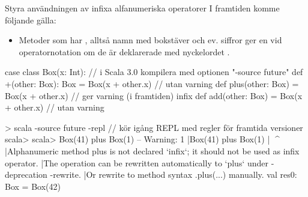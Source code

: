 \begin{Slide}{Styra användningen av infixa alfanumeriska operatorer}
I framtiden komme följande gälla:
\begin{itemize}
\item Metoder som har , alltså namn med bokstäver och ev. siffror ger en  vid operatornotation om de  är deklarerade med nyckelordet .   
\end{itemize}
\pause
\begin{Code}
case class Box(x: Int): // i Scala 3.0 kompilera med optionen "-source future"
  def +(other: Box): Box = Box(x + other.x)    // utan varning
  def plus(other: Box) = Box(x + other.x)      // ger varning (i framtiden)
  infix def add(other: Box) = Box(x + other.x) // utan varning
\end{Code}
\begin{REPLsmall}
> scala -source future -repl // kör igång REPL med regler för framtida versioner
scala> scala> Box(41) plus Box(1)
-- Warning:
1 |Box(41) plus Box(1)
  |        ^^^^
  |Alphanumeric method plus is not declared `infix`; it should not be used as infix operator.
  |The operation can be rewritten automatically to `plus` under -deprecation -rewrite.
  |Or rewrite to method syntax .plus(...) manually.
val res0: Box = Box(42)
\end{REPLsmall}
\end{Slide}




